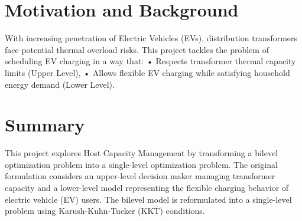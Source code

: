 \section{Motivation and Background}
With increasing penetration of Electric Vehicles (EVs), distribution transformers face potential thermal overload risks. This project tackles the problem of scheduling EV charging in a way that: • Respects transformer thermal capacity limits (Upper Level), • Allows flexible EV charging while satisfying household energy demand (Lower Level).


\section{Summary}

This project explores Host Capacity Management by transforming a bilevel optimization problem into a single-level optimization problem. The original formulation considers an upper-level decision maker managing transformer capacity and a lower-level model representing the flexible charging behavior of electric vehicle (EV) users. The bilevel model is reformulated into a single-level problem using Karush-Kuhn-Tucker (KKT) conditions.
